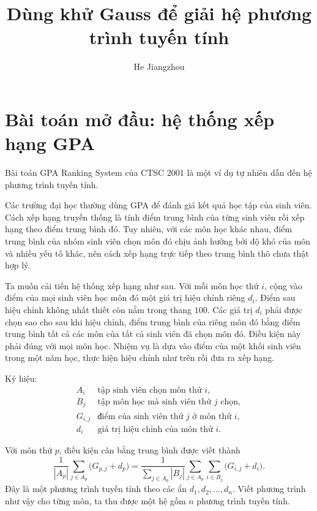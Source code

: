\documentclass[11pt]{article}
\title{Dùng khử Gauss để giải hệ phương trình tuyến tính}
\author{He Jiangzhou}
\date{}
\begin{document}
\maketitle


\tableofcontents

\section{Bài toán mở đầu: hệ thống xếp hạng GPA}

Bài toán GPA Ranking System của CTSC 2001 là một ví dụ tự nhiên dẫn đến hệ
phương trình tuyến tính.

Các trường đại học thường dùng GPA để đánh giá kết quả học tập của sinh viên.
Cách xếp hạng truyền thống là tính điểm trung bình của từng sinh viên rồi xếp
hạng theo điểm trung bình đó. Tuy nhiên, với các môn học khác nhau, điểm trung
bình của nhóm sinh viên chọn môn đó chịu ảnh hưởng bởi độ khó của môn và nhiều
yếu tố khác, nên cách xếp hạng trực tiếp theo trung bình thô chưa thật hợp lý.

Ta muốn cải tiến hệ thống xếp hạng như sau. Với mỗi môn học thứ \(i\), cộng
vào điểm của mọi sinh viên học môn đó một giá trị hiệu chỉnh riêng \(d_i\).
Điểm sau hiệu chỉnh không nhất thiết còn nằm trong thang \(100\). Các giá trị
\(d_i\) phải được chọn sao cho sau khi hiệu chỉnh, điểm trung bình của riêng
môn đó bằng điểm trung bình tất cả các môn của tất cả sinh viên đã chọn môn
đó. Điều kiện này phải đúng với mọi môn học. Nhiệm vụ là dựa vào điểm của một
khối sinh viên trong một năm học, thực hiện hiệu chỉnh như trên rồi đưa ra xếp
hạng.

Ký hiệu:
\[
\begin{array}{ll}
A_i & \text{tập sinh viên chọn môn thứ } i,\\
B_j & \text{tập môn học mà sinh viên thứ } j \text{ chọn},\\
G_{i,j} & \text{điểm của sinh viên thứ } j \text{ ở môn thứ } i,\\
d_i & \text{giá trị hiệu chỉnh của môn thứ } i.
\end{array}
\]

Với môn thứ \(p\), điều kiện cân bằng trung bình được viết thành
\[
  \frac{1}{|A_p|}\sum_{j\in A_p}\bigl(G_{p,j}+d_p\bigr)
  =
  \frac{1}{\sum_{j\in A_p}|B_j|}
  \sum_{j\in A_p}\sum_{i\in B_j}\bigl(G_{i,j}+d_i\bigr).
\]
Đây là một phương trình tuyến tính theo các ẩn
\(d_1,d_2,\ldots,d_n\). Viết phương trình như vậy cho từng môn, ta thu được
một hệ gồm \(n\) phương trình tuyến tính.
\end{document}
